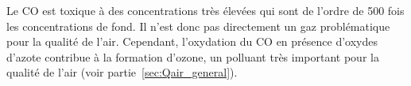 Le CO est toxique à des concentrations très élevées qui sont de l'ordre de 500 fois les concentrations de fond. Il n'est donc pas directement un gaz problématique pour la qualité de l'air. Cependant, l'oxydation du CO en présence d'oxydes d'azote contribue à la formation d'ozone, un polluant très important pour la qualité de l'air (voir partie~\ref{sec:Qair_general}). 



\stopcontents[chapters]
